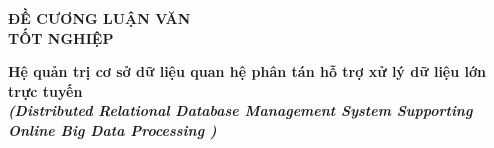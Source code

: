\documentclass{article}[14pt]
\begin{document}
    \begin{figure}[h]
        \begin{floatrow}
        {%
    
        }
        {%
    
        }
        \end{floatrow}
    \end{figure}
    
    \begin{center}
        
        \textbf{\Large ĐỀ CƯƠNG LUẬN VĂN \\  TỐT NGHIỆP} \\ 
    \end{center}
    
    
    \begin{center}
        
        \textbf{\huge Hệ quản trị cơ sở dữ liệu quan hệ phân tán hỗ trợ xử lý dữ liệu lớn trực tuyến } 
        \\
        
    \vspace{.5cm}
        \textit{\textbf{\Large (Distributed Relational Database Management System Supporting Online Big Data Processing  )}}
    \end{center}
    
\end{document}
